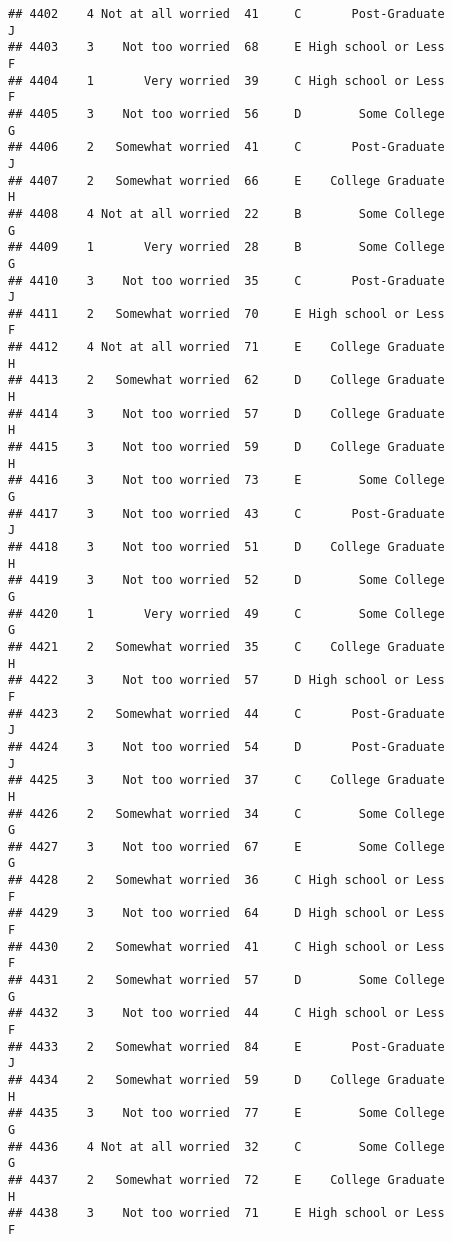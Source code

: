 \documentclass[
]{article}
\begin{document}
\begin{verbatim}
## 4402    4 Not at all worried  41     C       Post-Graduate         J
## 4403    3    Not too worried  68     E High school or Less         F
## 4404    1       Very worried  39     C High school or Less         F
## 4405    3    Not too worried  56     D        Some College         G
## 4406    2   Somewhat worried  41     C       Post-Graduate         J
## 4407    2   Somewhat worried  66     E    College Graduate         H
## 4408    4 Not at all worried  22     B        Some College         G
## 4409    1       Very worried  28     B        Some College         G
## 4410    3    Not too worried  35     C       Post-Graduate         J
## 4411    2   Somewhat worried  70     E High school or Less         F
## 4412    4 Not at all worried  71     E    College Graduate         H
## 4413    2   Somewhat worried  62     D    College Graduate         H
## 4414    3    Not too worried  57     D    College Graduate         H
## 4415    3    Not too worried  59     D    College Graduate         H
## 4416    3    Not too worried  73     E        Some College         G
## 4417    3    Not too worried  43     C       Post-Graduate         J
## 4418    3    Not too worried  51     D    College Graduate         H
## 4419    3    Not too worried  52     D        Some College         G
## 4420    1       Very worried  49     C        Some College         G
## 4421    2   Somewhat worried  35     C    College Graduate         H
## 4422    3    Not too worried  57     D High school or Less         F
## 4423    2   Somewhat worried  44     C       Post-Graduate         J
## 4424    3    Not too worried  54     D       Post-Graduate         J
## 4425    3    Not too worried  37     C    College Graduate         H
## 4426    2   Somewhat worried  34     C        Some College         G
## 4427    3    Not too worried  67     E        Some College         G
## 4428    2   Somewhat worried  36     C High school or Less         F
## 4429    3    Not too worried  64     D High school or Less         F
## 4430    2   Somewhat worried  41     C High school or Less         F
## 4431    2   Somewhat worried  57     D        Some College         G
## 4432    3    Not too worried  44     C High school or Less         F
## 4433    2   Somewhat worried  84     E       Post-Graduate         J
## 4434    2   Somewhat worried  59     D    College Graduate         H
## 4435    3    Not too worried  77     E        Some College         G
## 4436    4 Not at all worried  32     C        Some College         G
## 4437    2   Somewhat worried  72     E    College Graduate         H
## 4438    3    Not too worried  71     E High school or Less         F

\end{verbatim}
\end{document}
